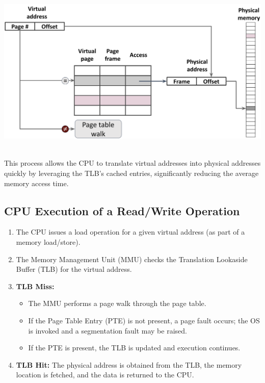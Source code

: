 \hfill
\vline
\hfill
\begin{minipage}{0.45\textwidth}
  \begin{center}
    \includegraphics[width=1.25\textwidth]{chapters/L5/images/tlb.png}
  \end{center}
\end{minipage}\\[9px]

This process allows the CPU to translate virtual addresses into physical addresses quickly by leveraging the TLB's cached entries, significantly reducing the average memory access time.
\newpage
\subsection{CPU Execution of a Read/Write Operation}
\begin{enumerate}
    \item The CPU issues a load operation for a given virtual address (as part of a memory load/store).
    \item The Memory Management Unit (MMU) checks the Translation Lookaside Buffer (TLB) for the virtual address.
    \item \textbf{TLB Miss:}
    \begin{itemize}
        \item The MMU performs a page walk through the page table.
        \item If the Page Table Entry (PTE) is not present, a page fault occurs; the OS is invoked and a segmentation fault may be raised.
        \item If the PTE is present, the TLB is updated and execution continues.
    \end{itemize}
    \item \textbf{TLB Hit:} The physical address is obtained from the TLB, the memory location is fetched, and the data is returned to the CPU.
\end{enumerate}

